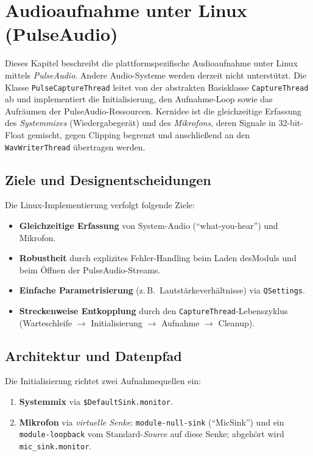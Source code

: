 
\chapter{Audioaufnahme unter Linux (PulseAudio)}
\label{chap:audio_linux}

Dieses Kapitel beschreibt die plattformspezifische Audioaufnahme unter Linux mittels \emph{PulseAudio}. Andere Audio-Systeme werden derzeit nicht unterstützt. Die Klasse \texttt{PulseCaptureThread} leitet von der abstrakten Basisklasse \texttt{CaptureThread} ab und implementiert die Initialisierung, den Aufnahme-Loop sowie das Aufräumen der PulseAudio-Ressourcen. Kernidee ist die gleichzeitige Erfassung des \emph{Systemmixes} (Wiedergabegerät) und des \emph{Mikrofons}, deren Signale in 32-bit-Float gemischt, gegen Clipping begrenzt und anschließend an den \texttt{WavWriterThread} übertragen werden.


\section{Ziele und Designentscheidungen}
\label{sec:linux_ziele}

Die Linux-Implementierung verfolgt folgende Ziele:
\begin{itemize}
    \item \textbf{Gleichzeitige Erfassung} von System-Audio (\enquote{what-you-hear}) und Mikrofon.
    \item \textbf{Robustheit} durch explizites Fehler-Handling beim Laden desModuls und beim Öffnen der PulseAudio-Streams.
    \item \textbf{Einfache Parametrisierung} (z.\,B.\ Lautstärkeverhältnisse) via \texttt{QSettings}.
    \item \textbf{Streckenweise Entkopplung} durch den \texttt{CaptureThread}-Lebenszyklus (Warteschleife $\rightarrow$ Initialisierung $\rightarrow$ Aufnahme $\rightarrow$ Cleanup).
\end{itemize}


\section{Architektur und Datenpfad}
\label{sec:linux_architektur}

Die Initialisierung richtet zwei Aufnahmequellen ein:
\begin{enumerate}
    \item \textbf{Systemmix} via \texttt{\$DefaultSink.monitor}.
    \item \textbf{Mikrofon} via \emph{virtuelle Senke}: \texttt{module-null-sink} (\enquote{MicSink}) und ein \texttt{module-loopback} vom Standard-\emph{Source} auf diese Senke; abgehört wird \texttt{mic\_sink.monitor}.
\end{enumerate}


